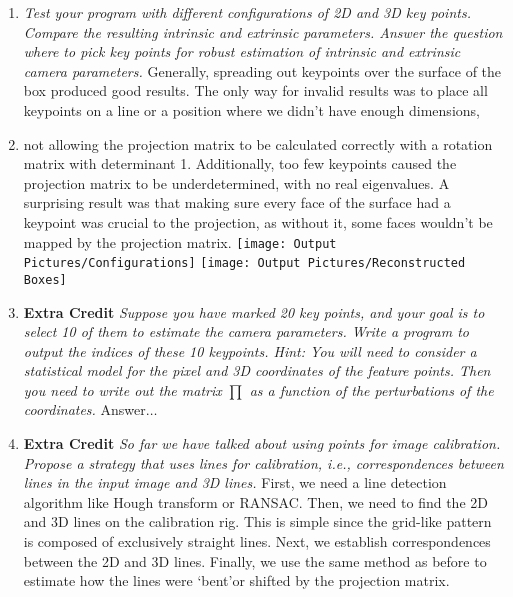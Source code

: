 \documentclass[11pt]{article}
\begin{document}
\begin{enumerate}
        \item \textit{Test your program with different configurations of 2D and 3D key points. Compare the resulting
        intrinsic and extrinsic parameters. Answer the question where to pick key points for robust estimation of
        intrinsic and extrinsic camera parameters.}\newline
        Generally, spreading out keypoints over the surface of the box produced good results. The only way for
        invalid results was to place all keypoints on a line or a position where we didn't have enough dimensions,
        \item not allowing the projection matrix to be calculated correctly with a rotation matrix with determinant 1.
        Additionally, too few keypoints caused the projection matrix to be underdetermined, with no real eigenvalues.
        A surprising result was that making sure every face of the surface had a keypoint was crucial to the projection,
        as without it, some faces wouldn't be mapped by the projection matrix.\newline
        \texttt{[image: Output Pictures/Configurations]}\newline
        \texttt{[image: Output Pictures/Reconstructed Boxes]}\newline

        \item \textbf{Extra Credit} \textit{Suppose you have marked 20 key points, and your goal is to select 10 of
        them to estimate the camera parameters. Write a program to output the indices of these 10 keypoints. Hint:
        You will need to consider a statistical model for the pixel and 3D coordinates of the feature points. Then
        you need to write out the matrix $\prod$ as a function of the perturbations of the coordinates.}\newline
        Answer$\ldots$\newline

        \item \textbf{Extra Credit} \textit{So far we have talked about using points for image calibration. Propose a
        strategy that uses lines for calibration, i.e., correspondences between lines in the input image and 3D
        lines.}\newline
        First, we need a line detection algorithm like Hough transform or RANSAC. Then, we need to find the 2D and 3D
        lines on the calibration rig. This is simple since the grid-like pattern is composed of exclusively straight
        lines. Next, we establish correspondences between the 2D and 3D lines. Finally, we use the same method as
        before to estimate how the lines were \textquoteleft bent\textquoteright or shifted by the projection matrix.\newline
    \end{enumerate}
\end{document}
